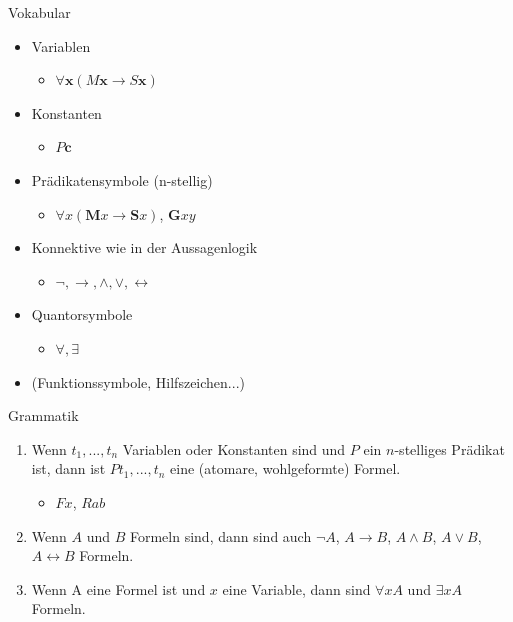 \documentclass[12pt]{beamer}
\begin{document}
\begin{frame}{Vokabular}
  \begin{itemize}
  \item<1-> Variablen
    \begin{itemize}
    \item $\forall \mathbf{x} (M\mathbf{x} \to S\mathbf{x})$
    \end{itemize}
  \item<2-> Konstanten
    \begin{itemize}
    \item $P\mathbf{c}$
    \end{itemize}
  \item<3-> Prädikatensymbole (n-stellig)
    \begin{itemize}
    \item $\forall x (\mathbf{M}x \to \mathbf{S}x)$, $\mathbf{G}xy$
    \end{itemize}
  \item<4-> Konnektive wie in der Aussagenlogik
    \begin{itemize}
    \item $\neg, \to, \land, \lor, \leftrightarrow$
    \end{itemize}
  \item<5-> Quantorsymbole
    \begin{itemize}
    \item $\forall, \exists$
    \end{itemize}
  \item<6-> (Funktionssymbole, Hilfszeichen...)
  \end{itemize}
\end{frame}


\begin{frame}{Grammatik}
  \begin{enumerate}
  \item<1-> Wenn $t_1,...,t_n$ Variablen oder Konstanten sind und $P$
    ein $n$-stelliges Prädikat ist, dann ist $Pt_1,...,t_n$ eine
    (atomare, wohlgeformte) Formel.
    \begin{itemize}
    \item<2-> $Fx$, $Rab$
    \end{itemize}
  \item<3-> Wenn $A$ und $B$ Formeln sind, dann sind auch $\neg A$,
    $A\to B$, $A \land B$, $A \lor B$, $A \leftrightarrow B$ Formeln.
  \item<4-> Wenn A eine Formel ist und $x$ eine Variable, dann sind
    $\forall xA$ und $\exists x A$ Formeln.
  \end{enumerate}
\end{frame}
\end{document}

